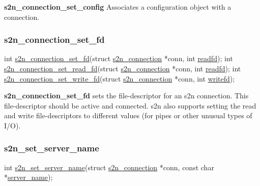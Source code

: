 {\bfseries s2n\+\_\+connection\+\_\+set\+\_\+config} Associates a configuration object with a connection.

\subsubsection*{s2n\+\_\+connection\+\_\+set\+\_\+fd}


\begin{DoxyCode}
\textcolor{keywordtype}{int} \hyperlink{s2n_8h_a80776ecf7e726f52165cdec5e2652d1e}{s2n\_connection\_set\_fd}(\textcolor{keyword}{struct} \hyperlink{structs2n__connection}{s2n\_connection} *conn, 
                          \textcolor{keywordtype}{int} \hyperlink{structs2n__connection_ab8b1e66f9a7b17fa4541b1733b87e011}{readfd});
\textcolor{keywordtype}{int} \hyperlink{s2n_8h_a098af174491e2fe62cb0635d1adab854}{s2n\_connection\_set\_read\_fd}(\textcolor{keyword}{struct} \hyperlink{structs2n__connection}{s2n\_connection} *conn, 
                               \textcolor{keywordtype}{int} \hyperlink{structs2n__connection_ab8b1e66f9a7b17fa4541b1733b87e011}{readfd});
\textcolor{keywordtype}{int} \hyperlink{s2n_8h_ab340fbb2459b04d8f6d2803483a14ab1}{s2n\_connection\_set\_write\_fd}(\textcolor{keyword}{struct} \hyperlink{structs2n__connection}{s2n\_connection} *conn, 
                                \textcolor{keywordtype}{int} \hyperlink{structs2n__connection_abb118879baad1066df4d078fdb2da908}{writefd});
\end{DoxyCode}


{\bfseries s2n\+\_\+connection\+\_\+set\+\_\+fd} sets the file-\/descriptor for an s2n connection. This file-\/descriptor should be active and connected. s2n also supports setting the read and write file-\/descriptors to different values (for pipes or other unusual types of I/O).

\subsubsection*{s2n\+\_\+set\+\_\+server\+\_\+name}


\begin{DoxyCode}
\textcolor{keywordtype}{int} \hyperlink{s2n_8h_a9b37f3c0364e6de9f0b534e624204f62}{s2n\_set\_server\_name}(\textcolor{keyword}{struct} \hyperlink{structs2n__connection}{s2n\_connection} *conn, 
                        \textcolor{keyword}{const} \textcolor{keywordtype}{char} *\hyperlink{structs2n__connection_aaeec7205ccf6834a5eaf18d9a5eb8936}{server\_name});
\end{DoxyCode}


